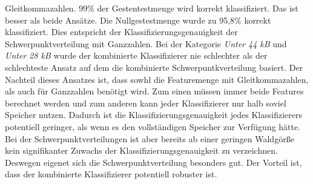 Gleitkommazahlen. 99\% der Gestentestmenge wird korrekt klassifiziert. Das ist besser als beide Ansätze. Die Nullgestestmenge wurde zu 95,8\% korrekt klassifiziert. Dies entspricht der Klassifizierungsgenauigkeit der
Schwerpunktverteilung mit Ganzzahlen. Bei der Kategorie \textit{Unter 44 kB} und \textit{Unter 28 kB} wurde der kombinierte Klassifizierer nie schlechter als der schlechteste Ansatz auf dem die kombinierte
Schwerpuntkverteilung basiert.
\newline
\newline
Der Nachteil dieses Ansatzes ist, dass sowhl die Featuremenge mit Gleitkommazahlen, als auch für Ganzzahlen benötigt wird. Zum einen müssen immer beide Features berechnet werden und zum anderen kann jeder Klassifizierer
nur halb soviel Speicher nutzen. Dadurch ist die Klassifizierungsgenauigkeit jedes Klassifizierers potentiell geringer, als wenn es den vollständigen Speicher zur Verfügung hätte. Bei der Schwerpunktverteilungen ist aber
bereits ab einer geringen Waldgörße kein signifikanter Zuwachs der Klassifizierungsgenauigkeit zu verzeichnen. Deswegen eigenet sich die Schwerpunktverteilung besonders gut. Der Vorteil ist, dass der kombinierte
Klassifizierer potentiell robuster ist.

